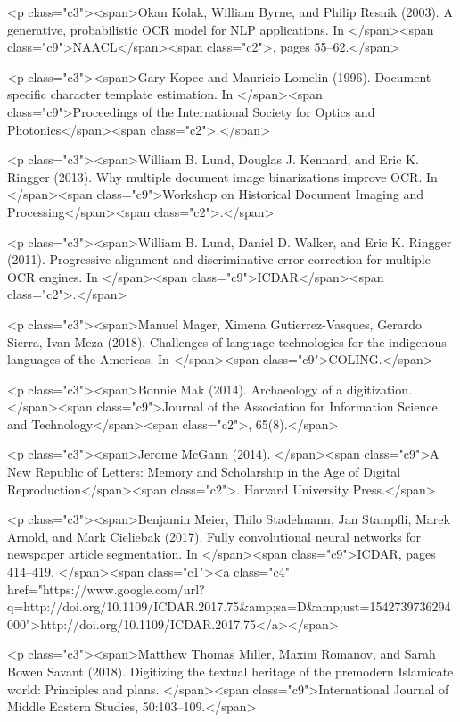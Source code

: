 \documentclass[twoside,11pt]{report}
\begin{document}
<p class="c3"><span>Okan Kolak, William Byrne, and Philip Resnik (2003). A generative, probabilistic OCR model for NLP applications. In </span><span class="c9">NAACL</span><span class="c2">, pages 55--62.</span>

<p class="c3"><span>Gary Kopec and Mauricio Lomelin (1996). Document-specific character template estimation. In </span><span class="c9">Proceedings of the International Society for Optics and Photonics</span><span class="c2">.</span>

<p class="c3"><span>William B. Lund, Douglas J. Kennard, and Eric K. Ringger (2013). Why multiple document image binarizations improve OCR. In </span><span class="c9">Workshop on Historical Document Imaging and Processing</span><span class="c2">.</span>

<p class="c3"><span>William B. Lund, Daniel D. Walker, and Eric K. Ringger (2011). Progressive alignment and discriminative error correction for multiple OCR engines. In </span><span class="c9">ICDAR</span><span class="c2">.</span>

<p class="c3"><span>Manuel Mager, Ximena Gutierrez-Vasques, Gerardo Sierra, Ivan Meza (2018). Challenges of language technologies for the indigenous languages of the Americas. In </span><span class="c9">COLING.</span>

<p class="c3"><span>Bonnie Mak (2014). Archaeology of a digitization. </span><span class="c9">Journal of the Association for Information Science and Technology</span><span class="c2">, 65(8).</span>

<p class="c3"><span>Jerome McGann (2014). </span><span class="c9">A New Republic of Letters: Memory and Scholarship in the Age of Digital Reproduction</span><span class="c2">. Harvard University Press.</span>

<p class="c3"><span>Benjamin Meier, Thilo Stadelmann, Jan Stampfli, Marek Arnold, and Mark Cieliebak (2017). Fully convolutional neural networks for newspaper article segmentation. In </span><span class="c9">ICDAR, pages 414--419. </span><span class="c1"><a class="c4" href="https://www.google.com/url?q=http://doi.org/10.1109/ICDAR.2017.75&amp;sa=D&amp;ust=1542739736294000">http://doi.org/10.1109/ICDAR.2017.75</a></span>

<p class="c3"><span>Matthew Thomas Miller, Maxim Romanov, and Sarah Bowen Savant (2018). Digitizing the textual heritage of the premodern Islamicate world: Principles and plans. </span><span class="c9">International Journal of Middle Eastern Studies, 50:103--109.</span>
\end{document}
